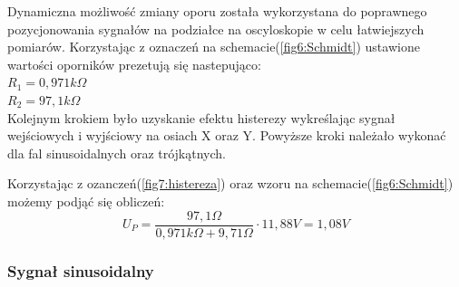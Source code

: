 \documentclass{article}
\begin{document}
    Dynamiczna możliwość zmiany oporu została wykorzystana do poprawnego pozycjonowania sygnałów na podziałce na oscyloskopie w celu łatwiejszych pomiarów. Korzystając z oznaczeń na schemacie(\ref{fig6:Schmidt}) ustawione wartości oporników prezetują się nastepująco: \\
    $R_1 = 0,971k\Omega$ \\
    $R_2 = 97,1k\Omega$ \\

    Kolejnym krokiem było uzyskanie efektu histerezy wykreślając sygnał wejściowych i wyjściowy na osiach X oraz Y. Powyższe kroki należało wykonać dla fal sinusoidalnych oraz trójkątnych.

    Korzystając z ozanczeń(\ref{fig7:histereza}) oraz wzoru na schemacie(\ref{fig6:Schmidt}) możemy podjąć się obliczeń:\\
    \begin{equation}
      U_P = \frac{97,1\Omega}{0,971k\Omega+9,71\Omega} \cdot 11,88V = 1,08V
    \end{equation}

    \subsubsection{Sygnał sinusoidalny}
\end{document}
